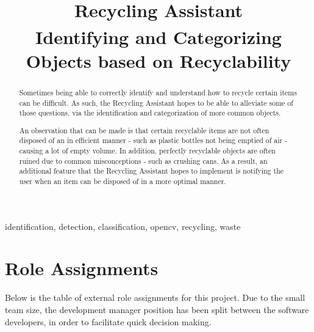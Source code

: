 \documentclass[conference]{IEEEtran}
\begin{document}
\title{Recycling Assistant\\
{\footnotesize \textsuperscript{}Identifying and Categorizing Objects based on Recyclability}
}

\author{
\and
{}
\and
{}
}

\maketitle

\begin{abstract}
Sometimes being able to correctly identify and understand how to recycle certain items can be difficult. As such, the Recycling Assistant hopes to be able to alleviate some of those questions, via the identification and categorization of more common objects.

An observation that can be made is that certain recyclable items are not often disposed of an in efficient manner - such as plastic bottles not being emptied of air - causing a lot of empty volume. In addition, perfectly recyclable objects are often ruined due to common misconceptions - such as crushing cans. As a result, an additional feature that the Recycling Assistant hopes to implement is notifying the user when an item can be disposed of in a more optimal manner.
\end{abstract}

\begin{IEEEkeywords}
identification, detection, classification, opencv, recycling, waste
\end{IEEEkeywords}

\section{Role Assignments}
Below is the table of external role assignments for this project. Due to the small team size, the development manager position has been split between the software developers, in order to facilitate quick decision making.
\newline
\end{document}
